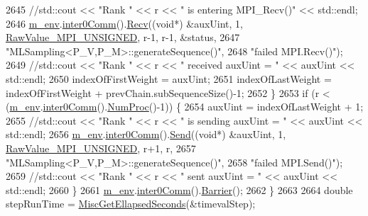 \begin{DoxyCode}
2645     \textcolor{comment}{//std::cout << "Rank " << r << " is entering MPI\_Recv()" << std::endl;}
2646           \hyperlink{class_q_u_e_s_o_1_1_m_l_sampling_a13f1ca4fe9f94822fe572a743eaced1d}{m\_env}.\hyperlink{class_q_u_e_s_o_1_1_base_environment_a689e4d140c74d495d97eb498714a4b82}{inter0Comm}().\hyperlink{class_q_u_e_s_o_1_1_mpi_comm_a12d7a87a4407e442c35a17d3caaf46c1}{Recv}((\textcolor{keywordtype}{void}*) &auxUint, 1, 
      \hyperlink{_mpi_comm_8h_a06cbfbc33436f6e0dc8a48ff3c49bdfc}{RawValue\_MPI\_UNSIGNED}, r-1, r-1, &status,
2647                                   \textcolor{stringliteral}{"MLSampling<P\_V,P\_M>::generateSequence()"},
2648                                   \textcolor{stringliteral}{"failed MPI.Recv()"});
2649     \textcolor{comment}{//std::cout << "Rank " << r << " received auxUint = " << auxUint << std::endl;}
2650           indexOfFirstWeight = auxUint;
2651           indexOfLastWeight = indexOfFirstWeight + prevChain.subSequenceSize()-1;
2652         \}
2653         \textcolor{keywordflow}{if} (r < (\hyperlink{class_q_u_e_s_o_1_1_m_l_sampling_a13f1ca4fe9f94822fe572a743eaced1d}{m\_env}.\hyperlink{class_q_u_e_s_o_1_1_base_environment_a689e4d140c74d495d97eb498714a4b82}{inter0Comm}().\hyperlink{class_q_u_e_s_o_1_1_mpi_comm_aa780721ae0fdeabc5a15e04cb0cad964}{NumProc}()-1)) \{
2654           auxUint = indexOfLastWeight + 1;
2655     \textcolor{comment}{//std::cout << "Rank " << r << " is sending auxUint = " << auxUint << std::endl;}
2656           \hyperlink{class_q_u_e_s_o_1_1_m_l_sampling_a13f1ca4fe9f94822fe572a743eaced1d}{m\_env}.\hyperlink{class_q_u_e_s_o_1_1_base_environment_a689e4d140c74d495d97eb498714a4b82}{inter0Comm}().\hyperlink{class_q_u_e_s_o_1_1_mpi_comm_a1ecdbeac992a2ab1ff12e45e0c1b53b4}{Send}((\textcolor{keywordtype}{void}*) &auxUint, 1, 
      \hyperlink{_mpi_comm_8h_a06cbfbc33436f6e0dc8a48ff3c49bdfc}{RawValue\_MPI\_UNSIGNED}, r+1, r,
2657                                   \textcolor{stringliteral}{"MLSampling<P\_V,P\_M>::generateSequence()"},
2658                                   \textcolor{stringliteral}{"failed MPI.Send()"});
2659     \textcolor{comment}{//std::cout << "Rank " << r << " sent auxUint = " << auxUint << std::endl;}
2660         \}
2661         \hyperlink{class_q_u_e_s_o_1_1_m_l_sampling_a13f1ca4fe9f94822fe572a743eaced1d}{m\_env}.\hyperlink{class_q_u_e_s_o_1_1_base_environment_a689e4d140c74d495d97eb498714a4b82}{inter0Comm}().\hyperlink{class_q_u_e_s_o_1_1_mpi_comm_a4059971c30e023b272fccaa6aa00c426}{Barrier}();
2662       \}
2663 
2664   \textcolor{keywordtype}{double} stepRunTime = \hyperlink{namespace_q_u_e_s_o_a424bc33f2e6e287fd468408d14b772ee}{MiscGetEllapsedSeconds}(&timevalStep);

\end{DoxyCode}
